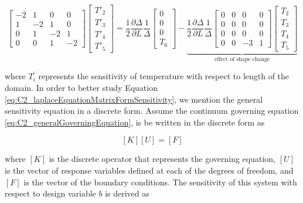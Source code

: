 \begin{equation}\label{eq:C2_laplaceEquationMatrixFormSensitivity}
	\begin{bmatrix}
		-2 & 1 & 0 & 0 \\
		1 & -2 & 1 & 0 \\
		0 & 1 & -2 & 1 \\
		0 & 0 & 1 & -2
	\end{bmatrix}
	\begin{bmatrix}
		T'_2 \\
		T'_3 \\
		T'_4 \\
		T'_5
	\end{bmatrix}
	=
	\frac{1}{2} \frac{\partial \Delta}{\partial L} \frac{1}{\Delta}
	\begin{bmatrix}
		0 \\
		0 \\
		0 \\
		T_6
	\end{bmatrix}
	-
	\underbrace{
	\frac{1}{2} \frac{\partial \Delta}{\partial L} \frac{1}{\Delta}
	\begin{bmatrix}
		0 & 0 & 0 & 0 \\
		0 & 0 & 0 & 0 \\
		0 & 0 & 0 & 0 \\
		0 & 0 & -3 & 1
	\end{bmatrix}
	\begin{bmatrix}
		T_2 \\
		T_3 \\
		T_4 \\
		T_5
	\end{bmatrix}}_\text{effect of shape change}
\end{equation}

where $T^\prime_i$ represents the sensitivity of temperature with respect to length of the domain. In order to better study Equation \eqref{eq:C2_laplaceEquationMatrixFormSensitivity}, we mention the general sensitivity equation in a discrete form. Assume the continuum governing equation \eqref{eq:C2_generalGoverningEquation}, is be written in the discrete form as

\begin{equation}
	\left[ K \right] \left[ U \right] = \left[ F \right]
\end{equation}

where $[K]$ is the discrete operator that represents the governing equation, $[U]$ is the vector of response variables defined at each of the degrees of freedom, and $[F]$ is the vector of the boundary conditions. The sensitivity of this system with respect to design variable $b$ is derived as

